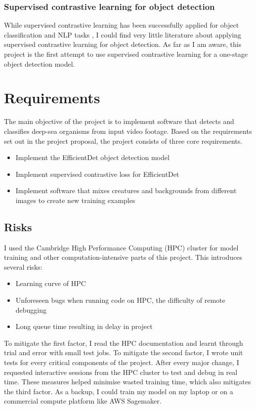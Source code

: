 \documentclass[12pt,a4paper,twoside,openright]{report}
\begin{document}
\subsubsection{Supervised contrastive learning for object detection}
While supervised contrastive learning has been successfully applied for object classification \cite{khosla_supervised_2021} and NLP tasks \cite{gunel_supervised_2021}, I could find very little literature about applying supervised contrastive learning for object detection. As far as I am aware, this project is the first attempt to use supervised contrastive learning for a one-stage object detection model.

\section{Requirements}
The main objective of the project is to implement software that detects and classifies deep-sea organisms from input video footage. Based on the requirements set out in the project proposal, the project consists of three core requirements.
\begin{itemize}
    \item Implement the EfficientDet object detection model
    \item Implement supervised contrastive loss for EfficientDet
    \item Implement software that mixes creatures and backgrounds from different images to create new training examples
\end{itemize}

\subsection{Risks}
I used the Cambridge High Performance Computing (HPC) cluster for model training and other computation-intensive parts of this project. This introduces several risks:
\begin{itemize}
    \item Learning curve of HPC
    \item Unforeseen bugs when running code on HPC, the difficulty of remote debugging
    \item Long queue time resulting in delay in project
\end{itemize}
To mitigate the first factor, I read the HPC documentation and learnt through trial and error with small test jobs. To mitigate the second factor, I wrote unit tests for every critical components of the project. After every major change, I requested interactive sessions from the HPC cluster to test and debug in real time. These measures helped minimise wasted training time, which also mitigates the third factor. As a backup, I could train my model on my laptop or on a commercial compute platform like AWS Sagemaker.
\end{document}
